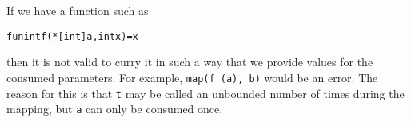 \documentclass[oneside]{memoir}
\begin{document}
If we have a function such as
\begin{alltt}
  fun int f(*[int] a, int x) = x
\end{alltt}
then it is not valid to curry it in such a way that we provide values
for the consumed parameters.  For example, \texttt{map(f (a), b)}
would be an error.  The reason for this is that \texttt{t} may be
called an unbounded number of times during the mapping, but \texttt{a}
can only be consumed once.
\end{document}

